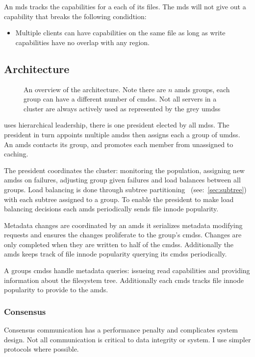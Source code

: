\begin{samepage}
An \ac{mds} tracks the capabilities for a each of its files. The \ac{mds} will not give out a capability that breaks the following condidtion:
%
\begin{itemize}
	\item Multiple clients can have capabilities on the same file as long as write capabilities have no overlap with any region.
\end{itemize}
\end{samepage}
% 
\subsection{Architecture}
\begin{figure}
	
	\caption{An overview of the architecture. Note there are $n$ \acf{amds} groups, each group can have a different number of \acfp{cmds}. Not all servers in a cluster are always actively used as represented by the grey \acfp{umds}}
\end{figure}

\Name{} uses hierarchical leadership, there is one president elected by all \acp{mds}. The president in turn appoints multiple \acfp{amds} then assigns each a group of \acfp{umds}. An \ac{amds} contacts its group, and promotes each member from unassigned to caching. 

The president coordinates the cluster: monitoring the population, assigning new \acp{amds} on failures, adjusting group given failures and load balances between all groups. Load balancing is done through subtree partitioning~\cite{ceph} (see:~\cref{sec:subtree}) with each subtree assigned to a group. To enable the president to make load balancing decisions each \ac{amds} periodically sends file innode popularity.

Metadata changes are coordinated by an \ac{amds} it serializes metadata modifying requests and ensures the changes proliferate to the group's \acp{cmds}. Changes are only completed when they are written to half of the \acp{cmds}. Additionally the \ac{amds} keeps track of file innode popularity querying its \acp{cmds} periodically.

A groups \acp{cmds} handle metadata queries: issueing read capabilities and providing information about the filesystem tree. Additionally each \ac{cmds} tracks file innode popularity to provide to the \ac{amds}. 
%
\subsubsection*{Consensus} \label{sec:concensus} \label{sec:praft}
Consensus communication has a performance penalty and complicates system design. Not all communication is critical to data integrity or system. I use simpler protocols where possible. 

